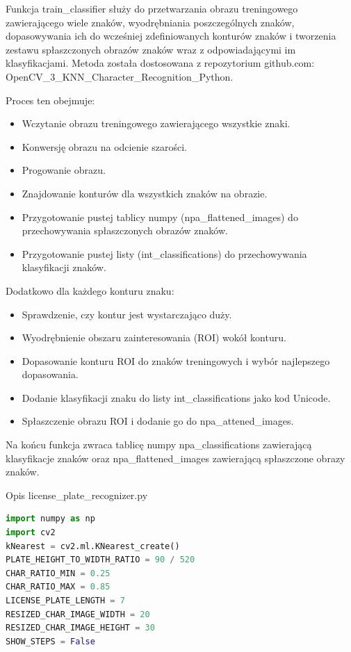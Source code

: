 \documentclass[12pt,a4paper,oneside]{article}
\theoremstyle{definition}
\numberwithin{equation}{section}
\begin{document}
   Funkcja train{\_}classifier służy do przetwarzania obrazu treningowego zawierającego wiele znaków, wyodrębniania poszczególnych znaków, dopasowywania ich do wcześniej zdefiniowanych konturów znaków i tworzenia zestawu spłaszczonych obrazów znaków wraz z odpowiadającymi im klasyfikacjami. Metoda została dostosowana z repozytorium github.com: OpenCV{\_}3{\_}KNN{\_}Character{\_}Recognition{\_}Python.



Proces ten obejmuje:
\begin{itemize}
  \item Wczytanie obrazu treningowego zawierającego wszystkie znaki.
  \item Konwersję obrazu na odcienie szarości.
  \item Progowanie obrazu.
  \item Znajdowanie konturów dla wszystkich znaków na obrazie.
  \item Przygotowanie pustej tablicy numpy (npa{\_}flattened{\_}images) do przechowywania spłaszczonych obrazów znaków.
  \item  Przygotowanie pustej listy (int{\_}classifications) do przechowywania klasyfikacji znaków.
\end{itemize}
    

Dodatkowo dla każdego konturu znaku:
\begin{itemize}
  \item Sprawdzenie, czy kontur jest wystarczająco duży.
  \item Wyodrębnienie obszaru zainteresowania (ROI) wokół konturu.
  \item Dopasowanie konturu ROI do znaków treningowych i wybór najlepszego dopasowania.
  \item Dodanie klasyfikacji znaku do listy int{\_}classifications jako kod Unicode.
  \item Spłaszczenie obrazu ROI i dodanie go do npa{\_}attened{\_}images.

\end{itemize}

Na końcu funkcja zwraca tablicę numpy npa{\_}classifications zawierającą klasyfikacje znaków oraz npa{\_}flattened{\_}images zawierającą spłaszczone obrazy znaków.    
    
Opis license{\_}plate{\_}recognizer.py

\begin{adjustbox}{max width=\textwidth}
\begin{lstlisting}[language=Python]
import numpy as np
import cv2
kNearest = cv2.ml.KNearest_create()
PLATE_HEIGHT_TO_WIDTH_RATIO = 90 / 520
CHAR_RATIO_MIN = 0.25
CHAR_RATIO_MAX = 0.85
LICENSE_PLATE_LENGTH = 7
RESIZED_CHAR_IMAGE_WIDTH = 20
RESIZED_CHAR_IMAGE_HEIGHT = 30
SHOW_STEPS = False

\end{lstlisting} 
\end{adjustbox}
\end{document}
